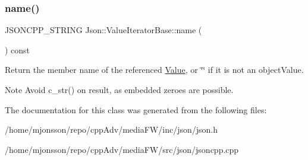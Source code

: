 \subsubsection{\texorpdfstring{name()}{name()}}
{\footnotesize\ttfamily J\+S\+O\+N\+C\+P\+P\+\_\+\+S\+T\+R\+I\+NG Json\+::\+Value\+Iterator\+Base\+::name (\begin{DoxyParamCaption}{ }\end{DoxyParamCaption}) const}

Return the member name of the referenced \hyperlink{classJson_1_1Value}{Value}, or \char`\"{}\char`\"{} if it is not an object\+Value. \begin{DoxyNote}{Note}
Avoid {\ttfamily c\+\_\+str()} on result, as embedded zeroes are possible. 
\end{DoxyNote}


The documentation for this class was generated from the following files\+:\begin{DoxyCompactItemize}
\item 
/home/mjonsson/repo/cpp\+Adv/media\+F\+W/inc/json/json.\+h\item 
/home/mjonsson/repo/cpp\+Adv/media\+F\+W/src/json/jsoncpp.\+cpp\end{DoxyCompactItemize}
